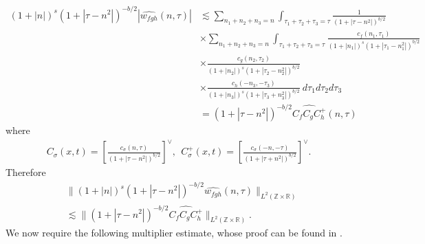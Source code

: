 \documentclass[12pt,reqno]{amsart}
\numberwithin{equation}{section}  %
\numberwithin{figure}{section}
\newcommand{\rr}{\mathbb{R}}
\newcommand{\zz}{\mathbb{Z}}
\newcommand{\wh}{\widehat}
\theoremstyle{plain}
\theoremstyle{definition}
\theoremstyle{remark}
\begin{document}
\begin{equation*}
  \begin{split}
    \left (1 + |n| \right )^s \left( 1 +  | \tau - n^{2}  | \right)^{-b/2} | 
    \wh{{w}_{fgh}}\left( n, \tau \right) | 
    & \lesssim \sum_{n_1 + n_2 + n_3 = n} \int_{\tau_1 + \tau_2 + \tau_3 = \tau} \frac{1}{\left( 1 +
    | \tau - n^{2}| 
    \right)^{b/2}}  
    \\
    & \times
    \sum_{n_1 + n_2 + n_3 = n} \int_{\tau_1 + \tau_2 + \tau_3 = \tau} \frac{c_f\left( n_1, \tau_1 
    \right)}{\left (1 + |n_1| \right )^s \left( 1 + | \tau_1 - n_1^2 |
    \right)^{b/2}}
    \\
    & \times \frac{c_{g}\left( n_2, \tau_2 \right)}{\left (1 + |n_2| \right ) 
    ^s\left( 1 + | \tau_2 -  n_2^2| 
    \right)^{b/2}}
    \\
    & \times \frac{c_{h}\left( -n_3, -\tau_3 \right)}{\left (1 + |n_3| \right ) ^s\left( 1 + | 
    \tau_3 + n_3^2 | \right)^{b/2}} \ d \tau_1 d \tau_2 d \tau_3
    \\
    & = \left( 1 + | \tau - n^{2} | \right)^{-b/2}
    \wh{C_f C_{g} C^+_{h}} \left( n, \tau \right)
  \end{split}
\end{equation*}
%
%
where
%
%
\begin{equation*}
  \begin{split}
    C_\sigma(x, t) = \left[ \frac{c_\sigma\left( n, \tau \right)}{\left( 
    1 + | \tau - n^{2} | \right)^{b/2}} \right]^\vee,
    \ \ C^+_\sigma(x, t) = \left[ \frac{c_\sigma\left( -n, -\tau \right)}{\left( 
    1 + | \tau + n^{2} | \right)^{b/2}} \right]^\vee.
  \end{split}
\end{equation*}
%
%
Therefore
%
%
\begin{equation}
  \label{gen-holder-pre-estimate}
  \begin{split}
    & \| \left( 1 + |n | \right)^s
    \left( 1 + | \tau - n^{2} | \right)^{-b/2} \wh{{w}_{fgh}}(n, 
    \tau)		
    \|_{L^2(\zz \times \rr)}
    \\
    & \lesssim \| \left( 1 + | \tau - n^{2} | \right)^{-b/2}
    \wh{C_f C_{g} C^+_{h}} \|_{L^2(\zz \times \rr)}.
  \end{split}
\end{equation}
%
We now require the following multiplier estimate, whose proof can be found in 
\cite{Himonas-Misiolek-2001-A-priori-estimates-for-Schrodinger}.
%
%
%
%
%
%
\end{document}
